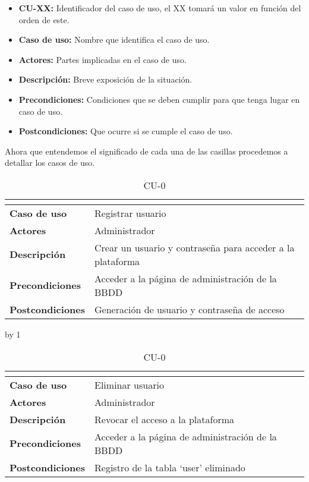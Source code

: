 \begin{itemize}
	\item \textbf{CU-XX:} Identificador del caso de uso, el XX tomará un valor en función del orden de este.
	\item \textbf{Caso de uso:} Nombre que identifica el caso de uso.
	\item \textbf{Actores:} Partes implicadas en el caso de uso.
	\item \textbf{Descripción:} Breve exposición de la situación.
	\item \textbf{Precondiciones:} Condiciones que se deben cumplir para que tenga lugar en caso de uso.
	\item \textbf{Postcondiciones:} Que ocurre si se cumple el caso de uso.
\end{itemize}

Ahora que entendemos el significado de cada una de las casillas procedemos a detallar los casos de uso.
\newcount\cu
{}
\begin{table}[H]
	\centering
	\caption{CU-0\number\cu}
	\begin{tabular}{|l|p{}|}
		\hline
		\multicolumn{2}{|c|}{\cellcolor[HTML]{BFBFBF}{\color[HTML]{000000} \textbf{CU-0\number\cu}}} \\ \hline
		\textbf{Caso de uso}     & Registrar usuario                                          \\ \hline
		\textbf{Actores}         & Administrador                                              \\ \hline
		\textbf{Descripción}     & Crear un usuario y contraseña para acceder a la plataforma \\ \hline
		\textbf{Precondiciones}  & Acceder a la página de administración de la BBDD           \\ \hline
		\textbf{Postcondiciones} & Generación de usuario y contraseña de acceso               \\ \hline
	\end{tabular}
\end{table}
\advance\cu by 1
\begin{table}[H]
	\centering
	\caption{CU-0\number\cu}
	\begin{tabular}{|l|p{}|}
		\hline
		\multicolumn{2}{|c|}{\cellcolor[HTML]{BFBFBF}{\color[HTML]{000000} \textbf{CU-0\number\cu}}} \\ \hline
		\textbf{Caso de uso}     & Eliminar usuario                                 \\ \hline
		\textbf{Actores}         & Administrador                                    \\ \hline
		\textbf{Descripción}     & Revocar el acceso a la plataforma                \\ \hline
		\textbf{Precondiciones}  & Acceder a la página de administración de la BBDD \\ \hline
		\textbf{Postcondiciones} & Registro de la tabla ‘user’ eliminado            \\ \hline
	\end{tabular}
\end{table}
